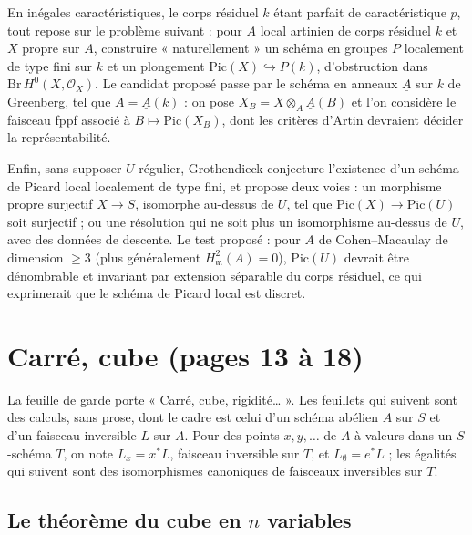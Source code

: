 \documentclass[11pt,a4paper]{article}
\begin{document}
En inégales caractéristiques, le corps résiduel $k$ étant parfait de
caractéristique $p$, tout repose sur le problème suivant : pour $A$ local
artinien de corps résiduel $k$ et $X$ propre sur $A$, construire
« naturellement » un schéma en groupes $P$ localement de type fini sur $k$ et
un plongement $\mathrm{Pic}(X) \hookrightarrow P(k)$, d'obstruction dans
$\mathrm{Br}\, H^0(X, \mathcal{O}_X)$. Le candidat proposé passe par le schéma
en anneaux $\underline{A}$ sur $k$ de Greenberg, tel que
$A = \underline{A}(k)$ : on pose $X_B = X \otimes_A \underline{A}(B)$ et l'on
considère le faisceau fppf associé à $B \mapsto \mathrm{Pic}(X_B)$, dont les
critères d'Artin devraient décider la représentabilité.

Enfin, sans supposer $U$ régulier, Grothendieck conjecture l'existence d'un
schéma de Picard local localement de type fini, et propose deux voies : un
morphisme propre surjectif $X \to S$, isomorphe au-dessus de $U$, tel que
$\mathrm{Pic}(X) \to \mathrm{Pic}(U)$ soit surjectif ; ou une résolution qui ne
soit plus un isomorphisme au-dessus de $U$, avec des données de descente. Le
test proposé : pour $A$ de Cohen--Macaulay de dimension $\geq 3$ (plus
généralement $H^2_{\mathfrak{m}}(A) = 0$), $\mathrm{Pic}(U)$ devrait être
dénombrable et invariant par extension séparable du corps résiduel, ce qui
exprimerait que le schéma de Picard local est discret.

\section*{Carré, cube (pages 13 à 18)}

La feuille de garde porte « Carré, cube, rigidité… ». Les feuillets qui
suivent sont des calculs, sans prose, dont le cadre est celui d'un schéma
abélien $A$ sur $S$ et d'un faisceau inversible $L$ sur $A$. Pour des points
$x, y, \ldots$ de $A$ à valeurs dans un $S$-schéma $T$, on note
$L_x = x^*L$, faisceau inversible sur $T$, et $L_\emptyset = e^*L$ ; les
égalités qui suivent sont des isomorphismes canoniques de faisceaux inversibles
sur $T$.

\subsection*{Le théorème du cube en $n$ variables}
\end{document}
